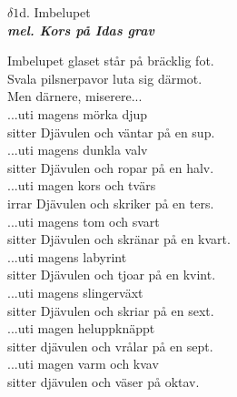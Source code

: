 \documentclass[a6paper,10pt]{article}
\newcommand{\mel}[1]{\small\textbf{\textit{mel. #1 \\}}}
\begin{document}
\newpage
\setlength{\oddsidemargin}{-0.47in}
\noindent
\begin{center}
\Large $\delta1$d. Imbelupet \\ 
\mel{Kors på Idas grav}
\end{center}
\small Imbelupet glaset står på bräcklig fot. \\
Svala pilsnerpavor luta sig därmot. \\
Men därnere, miserere... 
\vspace{5pt} \\
...uti magens mörka djup \\
sitter Djävulen och väntar på en sup. 
\vspace{5pt} \\
...uti magens dunkla valv \\
sitter Djävulen och ropar på en halv. 
\vspace{5pt} \\
...uti magen kors och tvärs \\
irrar Djävulen och skriker på en ters. 
\vspace{5pt} \\
...uti magens tom och svart \\
sitter Djävulen och skränar på en kvart. 
\vspace{5pt} \\
...uti magens labyrint \\
sitter Djävulen och tjoar på en kvint. 
\vspace{5pt} \\
...uti magens slingerväxt \\
sitter Djävulen och skriar på en sext. 
\vspace{5pt} \\
...uti magen heluppknäppt \\
sitter djävulen och vrålar på en sept. 
\vspace{5pt} \\
...uti magen varm och kvav \\
sitter djävulen och väser på oktav. 
\end{document}
